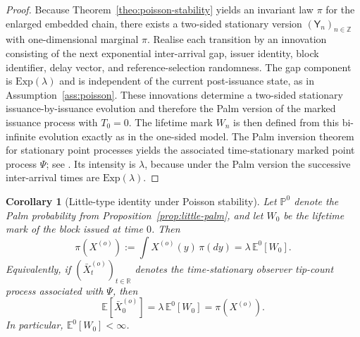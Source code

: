 \documentclass[a4paper,12pt,oneside,reqno]{amsart}
\renewcommand{\P}{{\mathbb P}}
\newcommand{\E}{{\mathbb E}}
\newcommand{\1}{{\mathbf 1}}
\newtheorem{cor}[theo]{Corollary}
\begin{document}
\begin{proof}
Because Theorem~\ref{theo:poisson-stability} yields an invariant law $\pi$ for the enlarged embedded chain, there exists a two-sided stationary version $(\mathsf{Y}_n)_{n\in\mathbb Z}$ with one-dimensional marginal $\pi$. Realise each transition by an innovation consisting of the next exponential inter-arrival gap, issuer identity, block identifier, delay vector, and reference-selection randomness. The gap component is $\mathrm{Exp}(\lambda)$ and is independent of the current post-issuance state, as in Assumption~\ref{ass:poisson}. These innovations determine a two-sided stationary issuance-by-issuance evolution and therefore the Palm version of the marked issuance process with $T_0=0$. The lifetime mark $W_n$ is then defined from this bi-infinite evolution exactly as in the one-sided model. The Palm inversion theorem for stationary point processes yields the associated time-stationary marked point process $\Psi$; see \cite[Chapter~VI]{Asm:03}. Its intensity is $\lambda$, because under the Palm version the successive inter-arrival times are $\mathrm{Exp}(\lambda)$.
\end{proof}

\begin{cor}[Little-type identity under Poisson stability]\label{cor:little-poisson}
Let $\P^0$ denote the Palm probability from Proposition~\ref{prop:little-palm}, and let $W_0$ be the lifetime mark of the block issued at time $0$. Then
\[
   \pi(X^{(o)}) := \int X^{(o)}(y)\,\pi(dy) = \lambda\,\E^{0}[W_0].
\]
Equivalently, if $(\bar X_t^{(o)})_{t\in\mathbb R}$ denotes the time-stationary observer tip-count process associated with $\Psi$, then
\[
   \E[\bar X_0^{(o)}] = \lambda\,\E^{0}[W_0] = \pi(X^{(o)}).
\]
In particular, $\E^{0}[W_0]<\infty$.
\end{cor}
\end{document}
